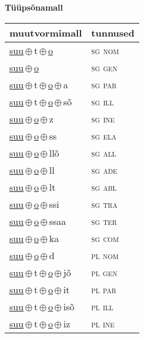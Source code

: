 

\vspace{3.5em}
\noindent \begin{minipage}{\textwidth}
\noindent \textbf{Tüüpsõnamall \,}\\

\begin{sideways}
\begin{tabular}{l l}
muutvormimall & tunnused \\
\hline
\underline{suu}\,$\oplus$\,t\,$\oplus$\,\underline{o} & \textsc{ sg nom } \\
\underline{suu}\,$\oplus$\,\underline{o} & \textsc{ sg gen } \\
\underline{suu}\,$\oplus$\,t\,$\oplus$\,\underline{o}\,$\oplus$\,a & \textsc{ sg par } \\
\underline{suu}\,$\oplus$\,t\,$\oplus$\,\underline{o}\,$\oplus$\,sõ & \textsc{ sg ill } \\
\underline{suu}\,$\oplus$\,\underline{o}\,$\oplus$\,z & \textsc{ sg ine } \\
\underline{suu}\,$\oplus$\,\underline{o}\,$\oplus$\,ss & \textsc{ sg ela } \\
\underline{suu}\,$\oplus$\,\underline{o}\,$\oplus$\,llõ & \textsc{ sg all } \\
\underline{suu}\,$\oplus$\,\underline{o}\,$\oplus$\,ll & \textsc{ sg ade } \\
\underline{suu}\,$\oplus$\,\underline{o}\,$\oplus$\,lt & \textsc{ sg abl } \\
\underline{suu}\,$\oplus$\,\underline{o}\,$\oplus$\,ssi & \textsc{ sg tra } \\
\underline{suu}\,$\oplus$\,\underline{o}\,$\oplus$\,ssaa & \textsc{ sg ter } \\
\underline{suu}\,$\oplus$\,\underline{o}\,$\oplus$\,ka & \textsc{ sg com } \\
\underline{suu}\,$\oplus$\,\underline{o}\,$\oplus$\,d & \textsc{ pl nom } \\
\underline{suu}\,$\oplus$\,t\,$\oplus$\,\underline{o}\,$\oplus$\,jõ & \textsc{ pl gen } \\
\underline{suu}\,$\oplus$\,t\,$\oplus$\,\underline{o}\,$\oplus$\,it & \textsc{ pl par } \\
\underline{suu}\,$\oplus$\,t\,$\oplus$\,\underline{o}\,$\oplus$\,isõ & \textsc{ pl ill } \\
\underline{suu}\,$\oplus$\,t\,$\oplus$\,\underline{o}\,$\oplus$\,iz & \textsc{ pl ine } \\

\end{tabular}
\end{sideways}
\end{minipage}
